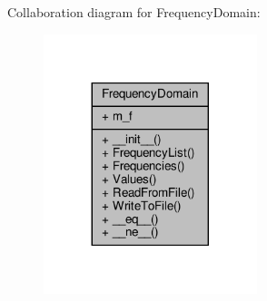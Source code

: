 Collaboration diagram for Frequency\+Domain\+:
\nopagebreak
\begin{figure}[H]
\begin{center}
\leavevmode
\includegraphics[width=176pt]{classSignalIntegrity_1_1FrequencyDomain_1_1FrequencyDomain_1_1FrequencyDomain__coll__graph}
\end{center}
\end{figure}
